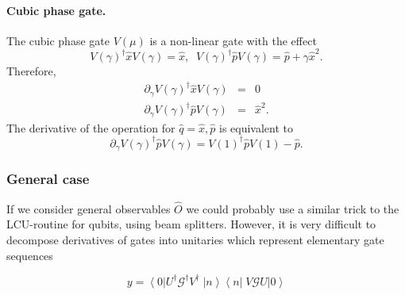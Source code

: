 \documentclass[aps,pra,10pt,twocolumn,groupedaddress,nofootinbib]{revtex4-1}
\theoremstyle{plain}
\newcommand{\ket}[1]{\ensuremath{\left| #1 \right \rangle}}
\newcommand{\bra}[1]{\ensuremath{\left \langle #1 \right |}}
\newcommand{\ketbra}[2]{\ket{#1}\bra{#2}}
\newcommand{\x}{\hat{x}}
\newcommand{\p}{\hat{p}}
\newcommand{\G}{\mathcal{G}}
\begin{document}
\paragraph{Cubic phase gate.}
The cubic phase gate $V(\mu)$ is a non-linear gate with the effect
\[V(\gamma)^{\dagger} \x V(\gamma) = \x, \;\; V(\gamma)^{\dagger} \p V(\gamma) = \p + \gamma \x^2. \]
Therefore, 
\begin{eqnarray}
\partial_{\gamma} V(\gamma)^{\dagger} \x V(\gamma) &=& 0\\
\partial_{\gamma} V(\gamma)^{\dagger} \p V(\gamma) &=& \x^2.
\end{eqnarray} 
The derivative of the operation for $\hat{q} = \x, \p$ is equivalent to 
\[ \partial_{\gamma} V(\gamma)^{\dagger} \hat{p} V(\gamma) =   V\left(1 \right)^{\dagger} \hat{p} V \left(1 \right) -  \hat{p}.
\]



\subsubsection{General case}

If we consider general observables $\hat{O}$ we could probably use a similar trick to the LCU-routine for qubits, using beam splitters. However, it is very difficult to decompose derivatives of gates into unitaries which represent elementary gate sequences 

\[ y = \bra{0}U^{\dagger} \G^{\dagger} V^{\dagger} \; \ketbra{n}{n} \; V \G U \ket{0} \]
\end{document}

